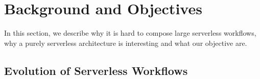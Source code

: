\section{Background and Objectives}\label{sec:bg}

\begin{table}[]
\centering
{}
\caption{Comparison with existing work}
\label{table:positioning}
\end{table}



In this section, we describe why it is hard to compose large serverless
workflows, why a purely serverless architecture is interesting and what our
objective are.

\subsection{Evolution of Serverless Workflows}

